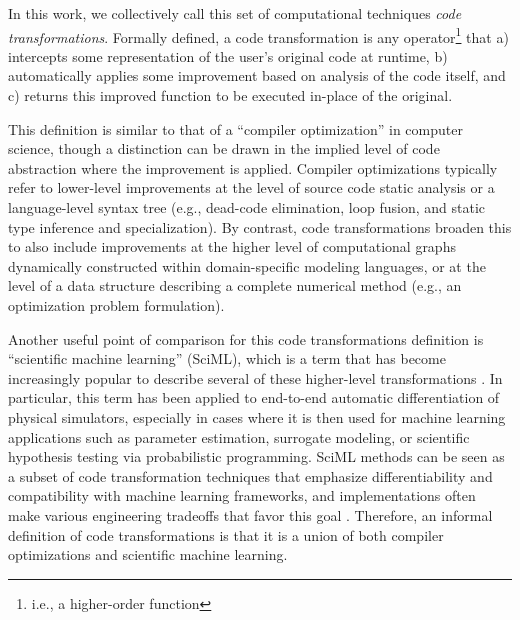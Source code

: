 In this work, we collectively call this set of computational techniques \emph{code transformations}. Formally defined, a code transformation is any operator\footnote{i.e., a higher-order function} that a) intercepts some representation of the user's original code at runtime, b) automatically applies some improvement based on analysis of the code itself, and c) returns this improved function to be executed in-place of the original.

This definition is similar to that of a ``compiler optimization'' in computer science, though a distinction can be drawn in the implied level of code abstraction where the improvement is applied. Compiler optimizations typically refer to lower-level improvements at the level of source code static analysis or a language-level syntax tree (e.g., dead-code elimination, loop fusion, and static type inference and specialization). By contrast, code transformations broaden this to also include improvements at the higher level of computational graphs dynamically constructed within domain-specific modeling languages, or at the level of a data structure describing a complete numerical method (e.g., an optimization problem formulation).

Another useful point of comparison for this code transformations definition is ``scientific machine learning'' (SciML), which is a term that has become increasingly popular to describe several of these higher-level transformations \cite{ma_modelingtoolkit_2021, hu_taichi_2018, lavin_simulation_2022}. In particular, this term has been applied to end-to-end automatic differentiation of physical simulators, especially in cases where it is then used for machine learning applications such as parameter estimation, surrogate modeling, or scientific hypothesis testing via probabilistic programming. SciML methods can be seen as a subset of code transformation techniques that emphasize differentiability and compatibility with machine learning frameworks, and implementations often make various engineering tradeoffs that favor this goal \cite{rackauckas_engineering_2021}. Therefore, an informal definition of code transformations is that it is a union of both compiler optimizations and scientific machine learning.


